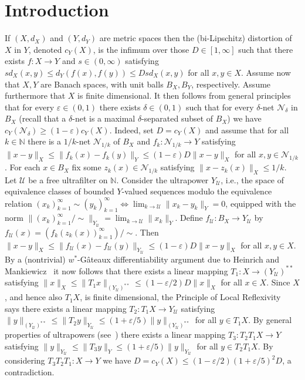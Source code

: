 \documentclass[12pt,reqno]{amsart}
\theoremstyle{plain}
\theoremstyle{definition}
\newcommand{\N}{\mathbb N}
\newcommand{\e}{\varepsilon}
\renewcommand{\d}{\delta}
\renewcommand{\le}{\leqslant}
\renewcommand{\ge}{\geqslant}
\newcommand{\U}{\mathscr U}
\begin{document}
\section{Introduction}

If $(X,d_X)$ and $(Y,d_Y)$ are metric spaces then the (bi-Lipschitz) distortion of $X$ in $Y$, denoted $c_Y(X)$, is the infimum over those $D\in [1,\infty]$ such that there exists $f:X\to Y$ and $s\in (0,\infty)$ satisfying $sd_X(x,y)\le d_Y(f(x),f(y))\le Dsd_X(x,y)$ for all $x,y\in X$. Assume now that $X,Y$ are Banach spaces, with unit balls $B_X,B_Y$, respectively. Assume furthermore that $X$ is finite dimensional. It then follows from general principles that for every $\e\in (0,1)$ there exists $\d\in (0,1)$ such that for every $\d$-net $\mathcal{N}_\d$ in $B_X$ (recall that a $\delta$-net is a maximal $\delta$-separated subset of $B_X$) we have $c_Y(\mathcal{N}_\d)\ge (1-\e) c_Y(X)$. Indeed, set $D=c_Y(X)$ and assume  that for all $k\in \N$ there is a $1/k$-net $\mathcal N_{1/k}$ of $B_X$ and  $f_k:\mathcal N_{1/k}\to Y$ satisfying $\|x-y\|_X\le \|f_k(x)-f_k(y)\|_Y\le (1-\e)D\|x-y\|_X$ for all $x,y\in \mathcal N_{1/k}$. For each $x\in B_X$ fix some $z_k(x)\in \mathcal N_{1/k}$ satisfying $\|x-z_k(x)\|_X\le 1/k$. Let $\mathscr U$ be a free ultrafilter on $\N$. Consider the ultrapower $Y_\U$, i.e., the space of equivalence classes of bounded $Y$-valued sequences  modulo the equivalence relation $(x_k)_{k=1}^\infty\sim (y_k)_{k=1}^\infty\iff \lim_{k\to \mathscr U}\|x_k-y_k\|_Y=0$, equipped with the norm $\|(x_k)_{k=1}^\infty/\sim\|_{Y_\U}=\lim_{k\to \U} \|x_k\|_Y$. Define $f_\U:B_X\to Y_\U$ by $f_\U(x)=(f_k(z_k(x))_{k=1}^\infty)/\sim$. Then $\|x-y\|_X\le \|f_\U(x)-f_\U(y)\|_{Y_\U}\le (1-\e)D\|x-y\|_X$ for all $x,y\in X$. By a (nontrivial) $w^*$-G\^ateaux differentiability argument due to Heinrich and Mankiewicz~\cite{HM82} it now follows that there exists a linear mapping $T_1:X\to (Y_\U)^{**}$ satisfying $\|x\|_X\le \|T_1x\|_{(Y_\U)^{**}}\le (1-\e/2)D\|x\|_X$ for all $x\in X$. Since $X$, and hence also $T_1X$, is finite dimensional, the Principle of Local Reflexivity~\cite{LR69} says there exists a linear mapping $T_2: T_1X\to Y_\U$ satisfying $\|y\|_{(Y_\U)^{**}}\le \|T_2y\|_{Y_\U}\le (1+\e/5)\|y\|_{(Y_\U)^{**}}$ for all $y\in T_1X$. By general properties of ultrapowers (see~\cite{Hei80}) there exists a linear mapping $T_3:T_2T_1X\to Y$ satisfying $\|y\|_{Y_\U}\le \|T_3 y\|_Y\le (1+\e/5)\|y\|_{Y_\U}$ for all $y\in T_2T_1X$. By considering $T_3T_2T_1:X\to Y$ we have $D=c_Y(X)\le (1-\e/2)(1+\e/5)^2D$, a contradiction.
\end{document}
